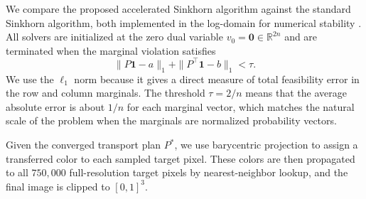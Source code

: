 \documentclass{article}
\theoremstyle{plain}
\theoremstyle{remark}
\newcommand{\LC}[1]{\textcolor{red}{#1}}
\begin{document}


We compare the proposed accelerated Sinkhorn algorithm against the standard Sinkhorn algorithm, both implemented in the log-domain for numerical stability \citep{chizat2016scaling}. All solvers are initialized at the zero dual variable $v_0=\mathbf{0}\in\mathbb{R}^{2n}$ and are terminated when the marginal violation satisfies
\begin{equation}\label{eq:l1tol}
\|P\mathbf{1}-a\|_1+\|P^\top\mathbf{1}-b\|_1<\tau.
\end{equation}
We use the $\ell_1$ norm because it gives a direct measure of total feasibility error in the row and column marginals. The threshold $\tau=2/n$ means that the average absolute error is about $1/n$ for each marginal vector, which matches the natural scale of the problem when the marginals are normalized probability vectors. 


Given the converged transport plan $P^*$, we use barycentric projection to assign a transferred color to each sampled target pixel. These colors are then propagated to all $750{,}000$ full-resolution target pixels by nearest-neighbor lookup, and the final image is clipped to $[0,1]^3$.
\end{document}
